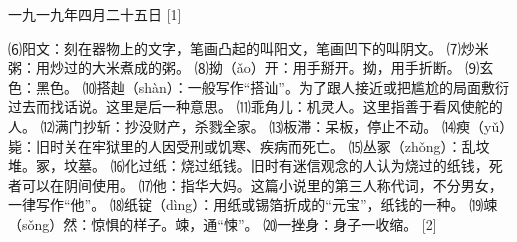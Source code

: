 \documentclass[12pt,UTF8]{ctexbook}
\begin{document}
一九一九年四月二十五日 [1]


⑹阳文：刻在器物上的文字，笔画凸起的叫阳文，笔画凹下的叫阴文。
⑺炒米粥：用炒过的大米煮成的粥。
⑻拗（ǎo）开：用手掰开。拗，用手折断。
⑼玄色：黑色。
⑽搭赸（shàn）：一般写作“搭讪”。为了跟人接近或把尴尬的局面敷衍过去而找话说。这里是后一种意思。
⑾乖角儿：机灵人。这里指善于看风使舵的人。
⑿满门抄斩：抄没财产，杀戮全家。
⒀板滞：呆板，停止不动。
⒁瘐（yǔ）毙：旧时关在牢狱里的人因受刑或饥寒、疾病而死亡。
⒂丛冢（zhǒng）：乱坟堆。冢，坟墓。
⒃化过纸：烧过纸钱。旧时有迷信观念的人认为烧过的纸钱，死者可以在阴间使用。
⒄他：指华大妈。这篇小说里的第三人称代词，不分男女，一律写作“他”。
⒅纸锭（dìng）：用纸或锡箔折成的“元宝”，纸钱的一种。
⒆竦（sǒng）然：惊惧的样子。竦，通“悚”。
⒇一挫身：身子一收缩。 [2]
\end{document}
